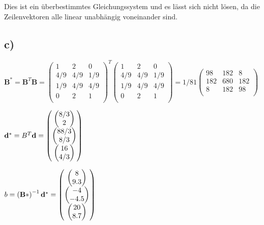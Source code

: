 Dies ist ein \"uberbestimmtes Gleichungssystem und es l\"asst sich nicht l\"osen, da die Zeilenvektoren alle linear unabh\"angig voneinander sind.

\subsection*{c)}
$\mathbf{B} ^* = \mathbf{B}^T \mathbf{B} =  \left( \begin{matrix} 
    1 & 2 &0 \\
    4/9 & 4/9 &1/9 \\
    1/9 & 4/9 & 4/9 \\
    0 & 2 &1  \\
\end{matrix} \right) ^T     \left( \begin{matrix} 
        1 & 2 &0 \\
        4/9 & 4/9 &1/9 \\
        1/9 & 4/9 & 4/9 \\
        0 & 2 &1  \\
    \end{matrix} \right) =     1/81\left( \begin{matrix} 
            98 & 182 &8 \\
            182 & 680 &182 \\
            8 & 182 & 98 \\
        \end{matrix} \right) $ 
        
$\mathbf{d}^* = B^T \mathbf{d} = \left( \begin{matrix} \left( \begin{matrix}8/3 \\ 2 \end{matrix}\right) \\ \left( \begin{matrix} 88/3 \\ 8/3\end{matrix}\right) \\ \left( \begin{matrix}16 \\ 4/3 \end{matrix}\right)\end{matrix}\right) $

$b = \left(\mathbf{B*} \right)^{-1} \mathbf{d^*} = \left( \begin{matrix} \left( \begin{matrix}8 \\ 9.3  \end{matrix}\right) \\ \left( \begin{matrix} -4  \\ -4.5\end{matrix}\right) \\ \left( \begin{matrix}20 \\ 8.7 \end{matrix}\right)\end{matrix}\right) $


\vspace{25pt}
